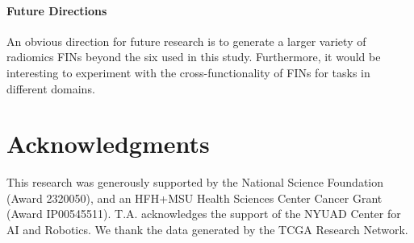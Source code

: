 \documentclass[conference]{IEEEtran}
\begin{document}
\paragraph*{Future Directions}
An obvious direction for future research is to generate a larger variety of radiomics FINs beyond the six used in this study. Furthermore, it would be interesting to experiment with the cross-functionality of FINs for tasks in different domains.


\section*{Acknowledgments}
This research was generously supported by the National Science Foundation (Award 2320050), and an HFH+MSU Health Sciences Center Cancer Grant (Award IP00545511). T.A. acknowledges the support of the NYUAD Center for AI and Robotics. We thank the data generated by the TCGA Research Network.





\end{document}
